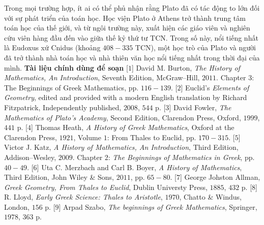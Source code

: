 \begin{multicols}{2}
		\vskip 0.1cm
		Trong mọi trường hợp, ít ai có thể phủ nhận rằng Plato đã có tác động to lớn đối với sự phát triển của toán học. Học viện Plato ở Athens trở thành trung tâm toán học của thế giới, và từ ngôi trường này, xuất hiện các giáo viên và nghiên cứu viên hàng đầu đến vào giữa thế kỷ thứ tư TCN. Trong số này, nổi tiếng nhất là Eudoxus xứ Cnidus (khoảng $408-335$ TCN),  một học trò của Plato và người đã trở thành nhà toán học và nhà thiên văn học nổi tiếng nhất trong thời đại của mình.
		\vskip 0.1cm
		\textbf{\color{lichsutoanhoc}Tài liệu chính dùng để soạn}
		\vskip 0.1cm
		[$1$] David M. Burton, \textit{The History of Mathematics, An Introduction}, Seventh Edition, McGraw--Hill, $2011$. Chapter $3$: The Beginnings of Greek Mathematics, pp. $116-139$.
		\vskip 0.1cm
		[$2$] Euclid’s \textit{Elements of Geometry}, edited and provided with a modern English translation by Richard Fitzpatrick, Independently published, $2008$, $544$ p.
		\vskip 0.1cm
		[$3$] David Fowler, \textit{The Mathematics of Plato’s Academy}, Second Edition, Clarendon Press, Oxford, $1999$, $441$ p.
		\vskip 0.1cm   
		[$4$] Thomas Heath, \textit{A History of Greek Mathematics}, Oxford at the Clarendon Press, $1921$, Volume $1$: From Thales to Euclid, pp. $170-315$.
		\vskip 0.1cm   
		[$5$] Victor J. Katz, \textit{A History of Mathematics, An Introduction}, Third Edition, Addison--Wesley, $2009$. Chapter $2$: \textit{The Beginnings of Mathematics in Greek}, pp. $40-49$.
		\vskip 0.1cm
		[$6$] Uta C. Merzbach and Carl B. Boyer, \textit{A
			History of Mathematics}, Third Edition, John Wiley \& Sons, $2011$, pp. $65-80$.
		\vskip 0.1cm
		[$7$] George Johston Allman, \textit{Greek Geometry, From Thales to Euclid}, Dublin Universty Press, $1885$, $432$ p.
		\vskip 0.1cm  
		[$8$] R. Lloyd, \textit{Early Greek Science: Thales to Aristotle}, $1970$, Chatto \& Windus, London, $156$ p.
		\vskip 0.1cm 
		[$9$] Arpad Szabo, \textit{The beginnings of Greek Mathematics}, Springer, $1978$, $363$ p.
\end{multicols}